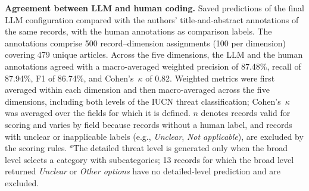 \begin{table}[H]
\caption{\textbf{Agreement between LLM and human coding.} Saved predictions of the final LLM configuration compared with the authors' title-and-abstract annotations of the same records, with the human annotations as comparison labels. The annotations comprise 500 record--dimension assignments (100 per dimension) covering 479 unique articles. Across the five dimensions, the LLM and the human annotations agreed with a macro-averaged weighted precision of 87.48\%, recall of 87.94\%, F1 of 86.74\%, and Cohen's~$\kappa$ of 0.82. Weighted metrics were first averaged within each dimension and then macro-averaged across the five dimensions, including both levels of the IUCN threat classification; Cohen's~$\kappa$ was averaged over the fields for which it is defined. $n$ denotes records valid for scoring and varies by field because records without a human label, and records with unclear or inapplicable labels (e.g., \textit{Unclear}, \textit{Not applicable}), are excluded by the scoring rules. $^{a}$The detailed threat level is generated only when the broad level selects a category with subcategories; 13 records for which the broad level returned \textit{Unclear} or \textit{Other options} have no detailed-level prediction and are excluded.}
\label{tab:llm_human_coding}
\end{table}
